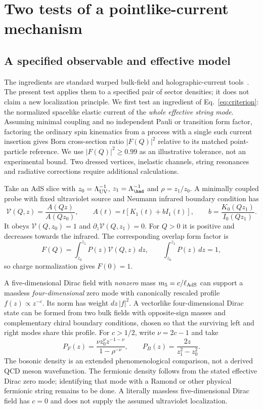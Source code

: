 \section{Two tests of a pointlike-current mechanism}
\label{sec:current-profiles}
\subsection{A specified observable and effective model}
The ingredients are standard warped bulk-field and holographic-current tools~\cite{GP,GR}. The present test applies them to a specified pair of sector densities; it does not claim a new localization principle.
We first test an ingredient of Eq.~\eqref{eq:criterion}: the normalized spacelike elastic current of the \emph{whole effective string mode}. Assuming minimal coupling and no independent Pauli or transition form factor, factoring the ordinary spin kinematics from a process with a single such current insertion gives Born cross-section ratio $|F(Q)|^2$ relative to its matched point-particle reference. We use $|F(Q)|^2\geq0.99$ as an illustrative tolerance, not an experimental bound. Two dressed vertices, inelastic channels, string resonances and radiative corrections require additional calculations.

Take an AdS slice with $z_0=\Lambda_{\rm UV}^{-1}$, $z_1=\Lambda_{\had}^{-1}$ and $\rho=z_1/z_0$. A minimally coupled probe with fixed ultraviolet source and Neumann infrared boundary condition has
\begin{equation}
 \mathcal V(Q,z)=\frac{A(Qz)}{A(Qz_0)},\qquad
 A(t)=t[K_1(t)+bI_1(t)],\qquad b=\frac{K_0(Qz_1)}{I_0(Qz_1)}.
 \label{eq:probe-profile}
\end{equation}
It obeys $\mathcal V(Q,z_0)=1$ and $\partial_z\mathcal V(Q,z_1)=0$. For $Q>0$ it is positive and decreases towards the infrared. The corresponding overlap form factor is
\begin{equation}
 F(Q)=\int_{z_0}^{z_1}P(z)\mathcal V(Q,z)\,dz,\qquad
 \int_{z_0}^{z_1}P(z)\,dz=1,
 \label{eq:current-overlap}
\end{equation}
so charge normalization gives $F(0)=1$.

A five-dimensional Dirac field with \emph{nonzero} mass $m_5=c/\ell_{\rm AdS}$ can support a massless \emph{four-dimensional} zero mode with canonically rescaled profile $f(z)\propto z^{-c}$. Its norm has weight $dz\,|f|^2$. A vectorlike four-dimensional Dirac state can be formed from two bulk fields with opposite-sign masses and complementary chiral boundary conditions, chosen so that the surviving left and right modes share this profile. For $c>1/2$, write $\nu=2c-1$ and take
\begin{equation}
 P_F(z)=\frac{\nu z_0^\nu z^{-1-\nu}}{1-\rho^{-\nu}},\qquad
 P_B(z)=\frac{2z}{z_1^2-z_0^2}.
 \label{eq:sector-profiles}
\end{equation}
The bosonic density is an extended phenomenological comparison, not a derived QCD meson wavefunction. The fermionic density follows from the stated effective Dirac zero mode; identifying that mode with a Ramond or other physical fermionic string remains to be done. A literally massless five-dimensional Dirac field has $c=0$ and does not supply the assumed ultraviolet localization.

